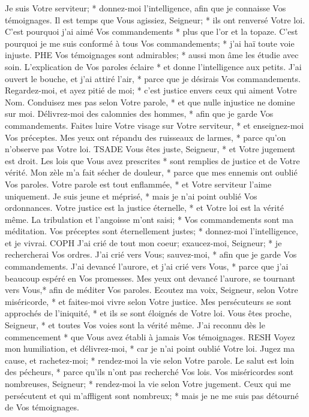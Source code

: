 Je suis Votre serviteur; * donnez-moi l'intelligence, afin que je connaisse Vos témoignages.
Il est temps que Vous agissiez, Seigneur; * ils ont renversé Votre loi.
C'est pourquoi j'ai aimé Vos commandements * plus que l'or et la topaze.
C'est pourquoi je me suis conformé à tous Vos commandements; * j'ai haï toute voie injuste.
PHE
Vos témoignages sont admirables; * aussi mon âme les étudie avec soin.
L'explication de Vos paroles éclaire * et donne l'intelligence aux petits.
J'ai ouvert le bouche, et j'ai attiré l'air, * parce que je désirais Vos commandements.
Regardez-moi, et ayez pitié de moi; * c'est justice envers ceux qui aiment Votre Nom.
Conduisez mes pas selon Votre parole, * et que nulle injustice ne domine sur moi.
Délivrez-moi des calomnies des hommes, * afin que je garde Vos commandements.
Faites luire Votre visage sur Votre serviteur, * et enseignez-moi Vos préceptes.
Mes yeux ont répandu des ruisseaux de larmes, * parce qu'on n'observe pas Votre loi.
TSADE
Vous êtes juste, Seigneur, * et Votre jugement est droit.
Les lois que Vous avez prescrites * sont remplies de justice et de Votre vérité.
Mon zèle m'a fait sécher de douleur, * parce que mes ennemis ont oublié Vos paroles.
Votre parole est tout enflammée, * et Votre serviteur l'aime uniquement.
Je suis jeune et méprisé, * mais je n'ai point oublié Vos ordonnances.
Votre justice est la justice éternelle, * et Votre loi est la vérité même.
La tribulation et l'angoisse m'ont saisi; * Vos commandements sont ma méditation.
Vos préceptes sont éternellement justes; * donnez-moi l'intelligence, et je vivrai.
COPH
J'ai crié de tout mon coeur; exaucez-moi, Seigneur; * je rechercherai Vos ordres.
J'ai crié vers Vous; sauvez-moi, * afin que je garde Vos commandements.
J'ai devancé l'aurore, et j'ai crié vers Vous, * parce que j'ai beaucoup espéré en Vos promesses.
Mes yeux ont devancé l'aurore, se tournant vers Vous,* afin de méditer Vos paroles.
Ecoutez ma voix, Seigneur, selon Votre miséricorde, * et faites-moi vivre selon Votre justice.
Mes persécuteurs se sont approchés de l'iniquité, * et ils se sont éloignés de Votre loi.
Vous êtes proche, Seigneur, * et toutes Vos voies sont la vérité même.
J'ai reconnu dès le commencement * que Vous avez établi à jamais Vos témoignages.
RESH
Voyez mon humiliation, et délivrez-moi, * car je n'ai point oublié Votre loi.
Jugez ma cause, et rachetez-moi; * rendez-moi la vie selon Votre parole.
Le salut est loin des pécheurs, * parce qu'ils n'ont pas recherché Vos lois.
Vos miséricordes sont nombreuses, Seigneur; * rendez-moi la vie selon Votre jugement.
Ceux qui me persécutent et qui m'affligent sont nombreux; * mais je ne me suis pas détourné de Vos témoignages.
